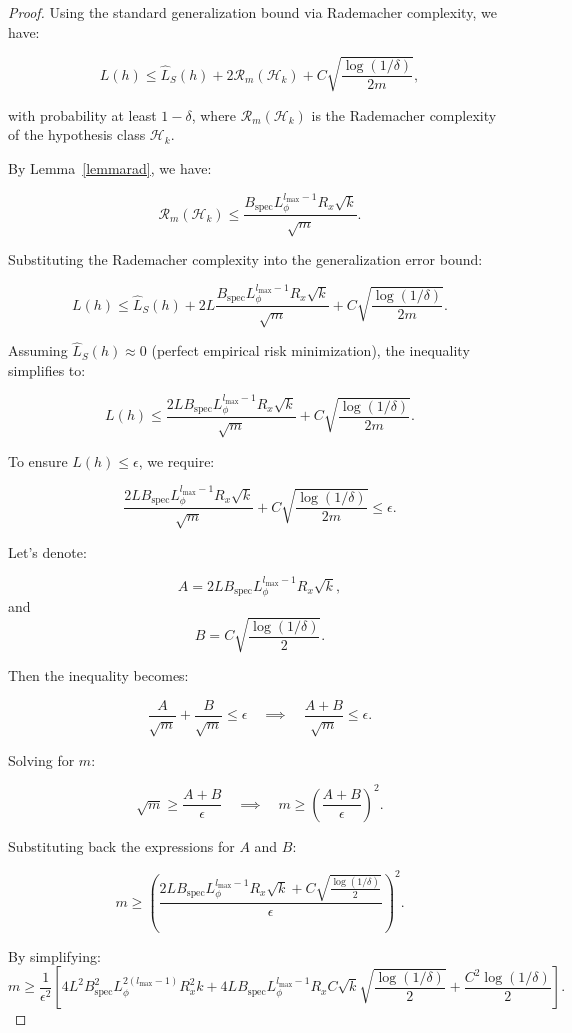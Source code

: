 \begin{proof}

Using the standard generalization bound via Rademacher complexity, we have:

\[
L(h) \leq \hat{L}_S(h) + 2 \mathcal{R}_m(\mathcal{H}_k) + C \sqrt{\frac{\log(1/\delta)}{2m}},
\]

with probability at least \( 1 - \delta \), where \( \mathcal{R}_m(\mathcal{H}_k) \) is the Rademacher complexity of the hypothesis class \( \mathcal{H}_k \).


By Lemma~\ref{lemmarad}, we have:

\[
\mathcal{R}_m(\mathcal{H}_k) \leq \frac{B_{\text{spec}} L_{\phi}^{l_{\text{max}}-1} R_x \sqrt{k}}{\sqrt{m}}.
\]


Substituting the Rademacher complexity into the generalization error bound:

\[
L(h) \leq \hat{L}_S(h) + 2 L \frac{B_{\text{spec}} L_{\phi}^{l_{\text{max}}-1} R_x \sqrt{k}}{\sqrt{m}} + C \sqrt{\frac{\log(1/\delta)}{2m}}.
\]

Assuming \( \hat{L}_S(h) \approx 0 \) (perfect empirical risk minimization), the inequality simplifies to:

\[
L(h) \leq \frac{2 L B_{\text{spec}} L_{\phi}^{l_{\text{max}}-1} R_x \sqrt{k}}{\sqrt{m}} + C \sqrt{\frac{\log(1/\delta)}{2m}}.
\]


To ensure \( L(h) \leq \epsilon \), we require:

\[
\frac{2 L B_{\text{spec}} L_{\phi}^{l_{\text{max}}-1} R_x \sqrt{k}}{\sqrt{m}} + C \sqrt{\frac{\log(1/\delta)}{2m}} \leq \epsilon.
\]

Let’s denote:

 \[ A = 2 L B_{\text{spec}} L_{\phi}^{l_{\text{max}}-1} R_x \sqrt{k}, \]
and \[ B = C \sqrt{\frac{\log(1/\delta)}{2}}. \]

Then the inequality becomes:

\[
\frac{A}{\sqrt{m}} + \frac{B}{\sqrt{m}} \leq \epsilon \quad \implies \quad \frac{A + B}{\sqrt{m}} \leq \epsilon.
\]

Solving for \( m \):

\[
\sqrt{m} \geq \frac{A + B}{\epsilon} \quad \implies \quad m \geq \left( \frac{A + B}{\epsilon} \right)^2.
\]

Substituting back the expressions for \( A \) and \( B \):

\[
m \geq \left( \frac{2 L B_{\text{spec}} L_{\phi}^{l_{\text{max}}-1} R_x \sqrt{k} + C \sqrt{\frac{\log(1/\delta)}{2}} }{ \epsilon } \right)^2.
\]


By simplifying:
\[
m \geq \frac{1}{\epsilon^2} \left[ 4 L^2 B_{\text{spec}}^2 L_{\phi}^{2(l_{\text{max}}-1)} R_x^2 k + 4 L B_{\text{spec}} L_{\phi}^{l_{\text{max}}-1} R_x C \sqrt{k} \sqrt{\frac{\log(1/\delta)}{2}} + \frac{C^2 \log(1/\delta)}{2} \right].
\]

\end{proof}
